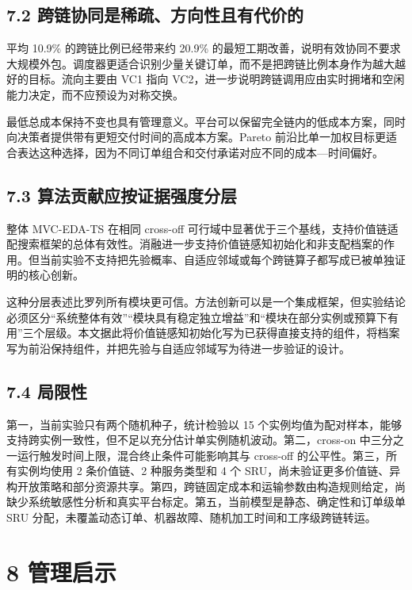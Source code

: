 \documentclass[UTF8,11pt]{ctexart}
\begin{document}
\subsection*{7.2 跨链协同是稀疏、方向性且有代价的}

平均 10.9\% 的跨链比例已经带来约 20.9\% 的最短工期改善，说明有效协同不要求大规模外包。调度器更适合识别少量关键订单，而不是把跨链比例本身作为越大越好的目标。流向主要由 VC1 指向 VC2，进一步说明跨链调用应由实时拥堵和空闲能力决定，而不应预设为对称交换。

最低总成本保持不变也具有管理意义。平台可以保留完全链内的低成本方案，同时向决策者提供带有更短交付时间的高成本方案。Pareto 前沿比单一加权目标更适合表达这种选择，因为不同订单组合和交付承诺对应不同的成本—时间偏好。

\subsection*{7.3 算法贡献应按证据强度分层}

整体 MVC-EDA-TS 在相同 cross-off 可行域中显著优于三个基线，支持价值链适配搜索框架的总体有效性。消融进一步支持价值链感知初始化和非支配档案的作用。但当前实验不支持把先验概率、自适应邻域或每个跨链算子都写成已被单独证明的核心创新。

这种分层表述比罗列所有模块更可信。方法创新可以是一个集成框架，但实验结论必须区分“系统整体有效”“模块具有稳定独立增益”和“模块在部分实例或预算下有用”三个层级。本文据此将价值链感知初始化写为已获得直接支持的组件，将档案写为前沿保持组件，并把先验与自适应邻域写为待进一步验证的设计。

\subsection*{7.4 局限性}

第一，当前实验只有两个随机种子，统计检验以 15 个实例均值为配对样本，能够支持跨实例一致性，但不足以充分估计单实例随机波动。第二，cross-on 中三分之一运行触发时间上限，混合终止条件可能影响其与 cross-off 的公平性。第三，所有实例均使用 2 条价值链、2 种服务类型和 4 个 SRU，尚未验证更多价值链、异构开放策略和部分资源共享。第四，跨链固定成本和运输参数由构造规则给定，尚缺少系统敏感性分析和真实平台标定。第五，当前模型是静态、确定性和订单级单 SRU 分配，未覆盖动态订单、机器故障、随机加工时间和工序级跨链转运。

\section*{8 管理启示}
\end{document}
